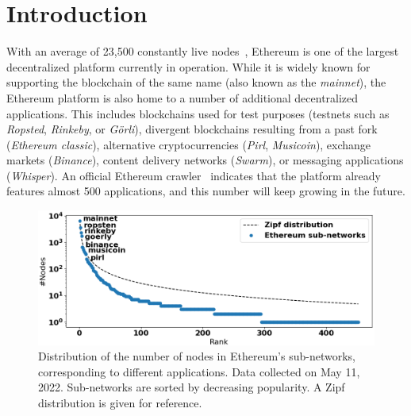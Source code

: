 
\section{Introduction}


With an average of 23,500 constantly live nodes~\cite{discv4-dns-lists}, Ethereum is one of the largest decentralized platform currently in operation.
While it is widely known for supporting the blockchain of the same name (also known as the \emph{mainnet}), the Ethereum platform is also home to a number of additional decentralized applications.
This includes blockchains used for test purposes (testnets such as \emph{Ropsted}, \emph{Rinkeby}, or \emph{G\"orli}), divergent blockchains resulting from a past fork (\emph{Ethereum classic}), alternative cryptocurrencies (\emph{Pirl}, \emph{Musicoin}), exchange markets (\emph{Binance}), content delivery networks (\emph{Swarm}), or messaging applications (\emph{Whisper}).
An official Ethereum crawler~\cite{discv4-dns-lists} indicates that the platform already features almost 500 applications, and this number will keep growing in the future.

\begin{figure}[t]
    \includegraphics[width=1\linewidth]{img/ecosystem}
    \caption{Distribution of the number of nodes in Ethereum's sub-networks, corresponding to different applications.
    Data collected on May 11, 2022.
    Sub-networks are sorted by decreasing popularity.
    A Zipf distribution is given for reference.
    \protect{}
    }
    \label{fig:ecosystem}
\end{figure}

